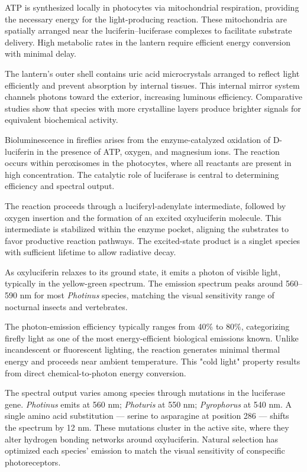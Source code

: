 ATP is synthesized locally in photocytes via mitochondrial respiration, providing the necessary energy for the light-producing reaction. These mitochondria are spatially arranged near the luciferin–luciferase complexes to facilitate substrate delivery. High metabolic rates in the lantern require efficient energy conversion with minimal delay.

The lantern’s outer shell contains uric acid microcrystals arranged to reflect light efficiently and prevent absorption by internal tissues. This internal mirror system channels photons toward the exterior, increasing luminous efficiency. Comparative studies show that species with more crystalline layers produce brighter signals for equivalent biochemical activity.

Bioluminescence in fireflies arises from the enzyme-catalyzed oxidation of D-luciferin in the presence of ATP, oxygen, and magnesium ions. The reaction occurs within peroxisomes in the photocytes, where all reactants are present in high concentration. The catalytic role of luciferase is central to determining efficiency and spectral output.

The reaction proceeds through a luciferyl-adenylate intermediate, followed by oxygen insertion and the formation of an excited oxyluciferin molecule. This intermediate is stabilized within the enzyme pocket, aligning the substrates to favor productive reaction pathways. The excited-state product is a singlet species with sufficient lifetime to allow radiative decay.

As oxyluciferin relaxes to its ground state, it emits a photon of visible light, typically in the yellow-green spectrum. The emission spectrum peaks around 560–590 nm for most \emph{Photinus} species, matching the visual sensitivity range of nocturnal insects and vertebrates.

The photon-emission efficiency typically ranges from 40\% to 80\%, categorizing firefly light as one of the most energy-efficient biological emissions known. Unlike incandescent or fluorescent lighting, the reaction generates minimal thermal energy and proceeds near ambient temperature. This "cold light" property results from direct chemical-to-photon energy conversion.

The spectral output varies among species through mutations in the luciferase gene. \emph{Photinus} emits at 560 nm; \emph{Photuris} at 550 nm; \emph{Pyrophorus} at 540 nm. A single amino acid substitution — serine to asparagine at position 286 — shifts the spectrum by 12 nm. These mutations cluster in the active site, where they alter hydrogen bonding networks around oxyluciferin. Natural selection has optimized each species' emission to match the visual sensitivity of conspecific photoreceptors.

